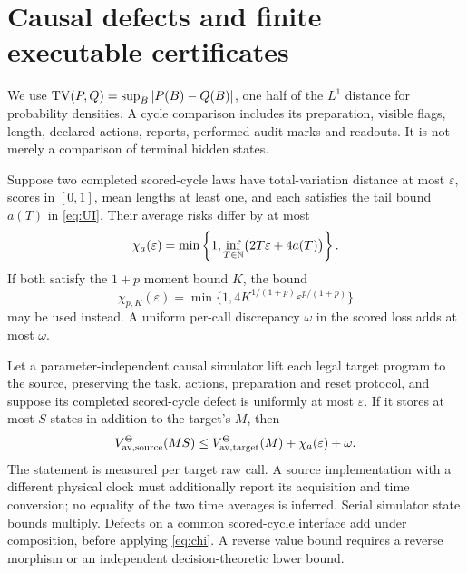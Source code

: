 \section{Causal defects and finite executable certificates}\label{sec:effective}
We use $\operatorname{TV}(P,Q)=\sup_B|P(B)-Q(B)|$, one half of the $L^1$ distance for probability densities. A cycle comparison includes its preparation, visible flags, length, declared actions, reports, performed audit marks and readouts. It is not merely a comparison of terminal hidden states.

\begin{theorem}\label{thm:defect}
Suppose two completed scored-cycle laws have total-variation distance at most $\varepsilon$, scores in $[0,1]$, mean lengths at least one, and each satisfies the tail bound $a(T)$ in \eqref{eq:UI}. Their average risks differ by at most
\begin{equation}\label{eq:chi}
 \chi_a(\varepsilon)=\min\left\{1,\inf_{T\in\mathbb N}
             \bigl(2T\varepsilon+4a(T)\bigr)\right\}.
\end{equation}
If both satisfy the $1+p$ moment bound $K$, the bound
\begin{equation}\label{eq:holder-defect}
 \chi_{p,K}(\varepsilon)=
 \min\{1,4K^{1/(1+p)}\varepsilon^{p/(1+p)}\}
\end{equation}
may be used instead. A uniform per-call discrepancy $\omega$ in the scored loss adds at most $\omega$.

Let a parameter-independent causal simulator lift each legal target program to the source, preserving the task, actions, preparation and reset protocol, and suppose its completed scored-cycle defect is uniformly at most $\varepsilon$. If it stores at most $S$ states in addition to the target's $M$, then
\begin{equation}\label{eq:sim}
 V_{\mathrm{av},\mathrm{source}}^\Theta(MS)
 \le V_{\mathrm{av},\mathrm{target}}^\Theta(M)+\chi_a(\varepsilon)+\omega.
\end{equation}
The statement is measured per target raw call. A source implementation with a different physical clock must additionally report its acquisition and time conversion; no equality of the two time averages is inferred. Serial simulator state bounds multiply. Defects on a common scored-cycle interface add under composition, before applying \eqref{eq:chi}. A reverse value bound requires a reverse morphism or an independent decision-theoretic lower bound.
\end{theorem}
